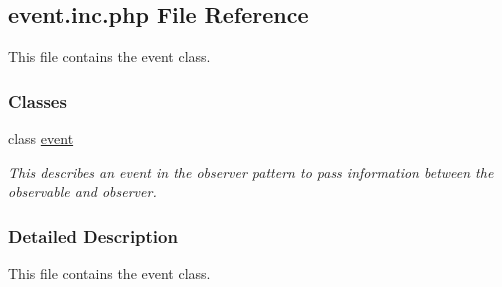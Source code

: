 \hypertarget{event_8inc_8php}{\subsection{event.\-inc.\-php File Reference}
\label{event_8inc_8php}
}


This file contains the event class.  


\subsubsection*{Classes}
\begin{DoxyCompactItemize}
\item 
class \hyperlink{classevent}{event}
\begin{DoxyCompactList}\small\item\em This describes an event in the observer pattern to pass information between the observable and observer. \end{DoxyCompactList}\end{DoxyCompactItemize}


\subsubsection{Detailed Description}
This file contains the event class. 
